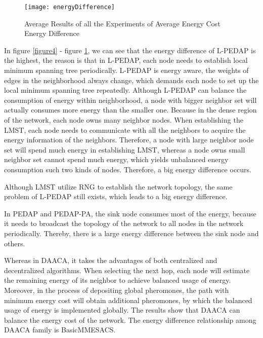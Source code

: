 \documentclass{elsarticle}
\begin{document}
\begin{figure}
\centering
  \texttt{[image: energyDifference]}\\
  \caption{Average Results of all the Experiments of Average Energy Cost Energy Difference}\label{figure6}
\end{figure}
In figure \ref{figure4} - figure \ref{figure6}, we can see that the energy difference of L-PEDAP is the highest, the reason is that in L-PEDAP, each node needs to establish local minimum spanning tree periodically. L-PEDAP is energy aware, the weights of edges in the neighborhood always change, which demands each node to set up the local minimum spanning tree repeatedly. Although L-PEDAP can balance the consumption of energy within neighborhood, a node with bigger neighbor set will actually consumes more energy than the smaller one. Because in the dense region of the network, each node owns many neighbor nodes. When establishing the LMST, each node needs to communicate with all the neighbors to acquire the energy information of the neighbors. Therefore, a node with large neighbor node set will spend much energy in establishing LMST, whereas a node owns small neighbor set cannot spend much energy, which yields unbalanced energy consumption such two kinds of nodes. Therefore, a big energy difference occurs.

Although LMST utilize RNG to establish the network topology, the same problem of L-PEDAP still exists, which leads to a big energy difference.

In PEDAP and PEDAP-PA, the sink node consumes most of the energy, because it needs to broadcast the topology of the network to all nodes in the network periodically. Thereby, there is a large energy difference between the sink node and others.

Whereas in DAACA, it takes the advantages of both centralized and decentralized algorithms. When selecting the next hop, each node will estimate the remaining energy of its neighbor to achieve balanced usage of energy. Moreover, in the process of depositing global pheromones, the path with minimum energy cost will obtain additional pheromones, by which the balanced usage of energy is implemented globally. The results show that DAACA can balance the energy cost of the network. The energy difference relationship among DAACA family is BasicMMESACS.
\end{document}
